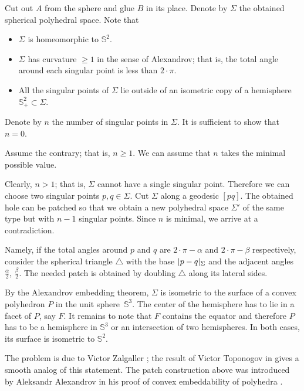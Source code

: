 Cut out $A$ from the sphere and glue $B$ in its place.
Denote by $\Sigma$ the obtained spherical polyhedral space.
Note that 
\begin{itemize}
\item $\Sigma$ is homeomorphic to $\mathbb S^2$.
\item $\Sigma$ has curvature $\ge 1$ in the sense of Alexandrov; that is, the total angle around each singular point is less than $2\cdot \pi$.
\item All the singular points of $\Sigma$ 
lie outside of an isometric copy of a hemisphere $\mathbb{S}^2_+\subset \Sigma$.
\end{itemize}

Denote by $n$ the number of singular points in $\Sigma$.
It is sufficient to show that $n=0$.

Assume the contrary; that is, $n\ge 1$.
We can assume that $n$ takes the minimal possible value.

Clearly, $n>1$;
that is, $\Sigma$ cannot have a single singular point.
Therefore we can choose two singular points $p,q\in \Sigma$.
Cut $\Sigma$ along a geodesic $[pq]$.
The obtained hole can be patched so that we obtain a new polyhedral space $\Sigma'$ of the same type but with $n-1$ singular points.
Since $n$ is minimal, we arrive at a contradiction.

Namely, if the total angles around $p$ and $q$ are $2\cdot \pi-\alpha$ and $2\cdot \pi-\beta$ respectively,
consider the spherical triangle $\triangle$ with the base $|p\z-q|_\Sigma$ and the adjacent angles $\tfrac\alpha2$, $\tfrac\beta2$. 
The needed patch is obtained by doubling $\triangle$ along its lateral sides.
\qeds

By the Alexandrov embedding theorem, $\Sigma$ is isometric to the surface of a convex polyhedron $P$ in the unit sphere~$\mathbb S^3$.
The center of the hemisphere has to lie in a facet of $P$, say $F$.
It remains to note that $F$ contains the equator and therefore $P$ has to be a hemisphere in $\mathbb S^3$ or an intersection of two hemispheres.
In both cases, its surface is isometric to $\mathbb S^2$.
\qeds

The problem is due to Victor Zalgaller \cite{zalgaller-shperical-polygon};
the result of Victor Toponogov in \cite{toponogov} gives a smooth analog of this statement.
The patch construction above was introduced by 
Aleksandr Alexandrov
in his proof of convex embeddability of polyhedra
\cite[see VI, \S7 in][]{alexandrov1948}.



